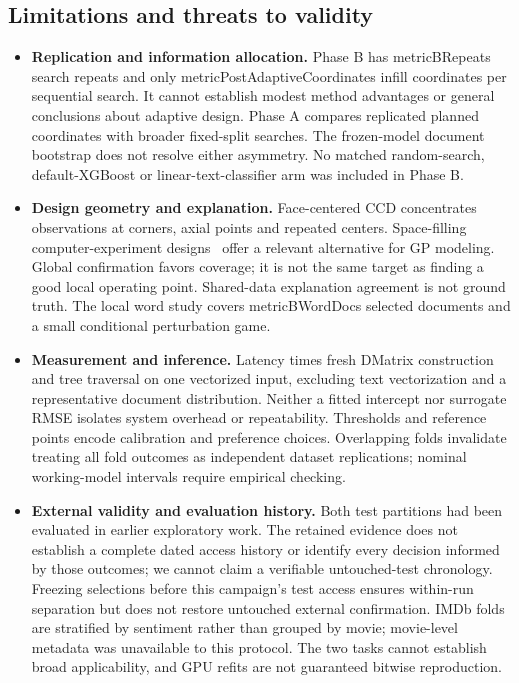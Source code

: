 \documentclass[12pt,a4paper]{article}
\newcommand{\m}[1]{\csname metric#1\endcsname}
\begin{document}
\subsection{Limitations and threats to validity}
\begin{itemize}
\item \textbf{Replication and information allocation.} Phase B has \m{BRepeats} search repeats and only \m{PostAdaptiveCoordinates} infill coordinates per sequential search. It cannot establish modest method advantages or general conclusions about adaptive design. Phase A compares replicated planned coordinates with broader fixed-split searches. The frozen-model document bootstrap does not resolve either asymmetry. No matched random-search, default-XGBoost or linear-text-classifier arm was included in Phase B.
\item \textbf{Design geometry and explanation.} Face-centered CCD concentrates observations at corners, axial points and repeated centers. Space-filling computer-experiment designs~\cite{sacks,santner} offer a relevant alternative for GP modeling. Global confirmation favors coverage; it is not the same target as finding a good local operating point. Shared-data explanation agreement is not ground truth. The local word study covers \m{BWordDocs} selected documents and a small conditional perturbation game.
\item \textbf{Measurement and inference.} Latency times fresh DMatrix construction and tree traversal on one vectorized input, excluding text vectorization and a representative document distribution. Neither a fitted intercept nor surrogate RMSE isolates system overhead or repeatability. Thresholds and reference points encode calibration and preference choices. Overlapping folds invalidate treating all fold outcomes as independent dataset replications; nominal working-model intervals require empirical checking.
\item \textbf{External validity and evaluation history.} Both test partitions had been evaluated in earlier exploratory work. The retained evidence does not establish a complete dated access history or identify every decision informed by those outcomes; we cannot claim a verifiable untouched-test chronology. Freezing selections before this campaign's test access ensures within-run separation but does not restore untouched external confirmation. IMDb folds are stratified by sentiment rather than grouped by movie; movie-level metadata was unavailable to this protocol. The two tasks cannot establish broad applicability, and GPU refits are not guaranteed bitwise reproduction.
\end{itemize}
\end{document}
